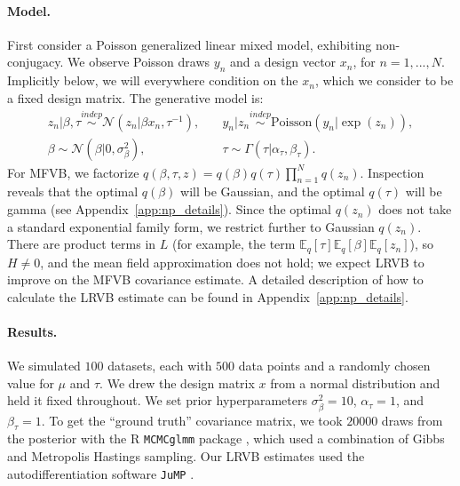 \documentclass{article}\usepackage[]{graphicx}\usepackage[]{color}
\newcommand{\app}[1]{Appendix~\ref{app:#1}}
\newcommand{\gauss}{\mathcal{N}} %
\theoremstyle{plain}
\newcommand{\mbeq}{\mathbb{E}_{q}}
\newcommand{\indep}{\stackrel{indep}{\sim}}
\begin{document}
\paragraph{Model.}
First consider a Poisson generalized linear mixed model, exhibiting non-conjugacy.
We observe Poisson draws $y_n$ and a design vector $x_n$, for $n=1,...,N$.
Implicitly below, we will everywhere condition on the $x_n$, which
we consider to be a fixed design matrix.
The generative model is:
\begin{align}
  z_n \vert \beta, \tau \indep \gauss\left(z_n \vert \beta x_n, \tau^{-1}\right), &
  \quad
  y_n \vert z_n \indep \textrm{Poisson}\left(y_n \vert \exp(z_n)\right), \label{eq:pn_model}\\
  \beta \sim \gauss( \beta \vert 0, \sigma^2_\beta), &
  \quad
  \tau \sim \Gamma( \tau \vert \alpha_\tau, \beta_\tau).
  \nonumber
\end{align}
%
For MFVB, we factorize $q\left(\beta,\tau,z\right) =
q\left(\beta\right)q\left(\tau\right)\prod_{n=1}^{N}q\left(z_{n}\right)$.
Inspection reveals that the optimal $q\left(\beta\right)$ will be Gaussian, and
the optimal $q\left(\tau\right)$ will be gamma (see \app{np_details}). Since the
optimal $q\left(z_n\right)$ does not take a standard exponential family form, we
restrict further to Gaussian $q\left(z_{n}\right)$. There are product terms in
$L$ (for example, the term
$\mbeq\left[\tau\right]\mbeq\left[\beta\right]\mbeq\left[z_{n}\right]$), so
$H\ne0$, and the mean field approximation does not hold; we expect LRVB to
improve on the MFVB covariance estimate.  A detailed description of how to
calculate the LRVB estimate can be found in \app{np_details}.

\paragraph{Results.}




\newcommand{\pnn}{500}
\newcommand{\pnnsims}{100}
\newcommand{\pnmupriorvar}{10}
\newcommand{\pntaualpha}{1}
\newcommand{\pntaubeta}{1}
\newcommand{\pnmcmciters}{20000}


We simulated $\pnnsims$ datasets, each with $\pnn$ data points and a randomly
chosen value for $\mu$ and $\tau$.  We drew the design matrix $x$ from a normal
distribution and held it fixed throughout.  We set prior hyperparameters
$\sigma_\beta^{2} = \pnmupriorvar$, $\alpha_\tau = \pntaualpha$, and $\beta_\tau =
\pntaubeta$. To get the ``ground truth'' covariance matrix, we took
$\pnmcmciters$ draws from the posterior with the R \texttt{MCMCglmm} package
\citep{rpackage:MCMCglmm}, which used a combination of Gibbs and Metropolis
Hastings sampling.  Our LRVB estimates used the autodifferentiation software
\texttt{JuMP} \citep{JuMP:LubinDunningIJOC}.
\end{document}
